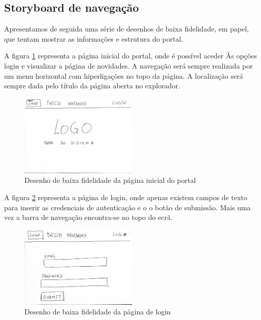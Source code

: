 \FloatBarrier\subsection{Storyboard de navegação}

Apresentamos de seguida uma série de desenhos de baixa fidelidade, em papel, que tentam mostrar as informações e estrutura do portal.

\FloatBarrier
A figura \ref{fig:inicio} representa a página inicial do portal, onde é possível aceder Às opções login e visualizar a página de novidades. A navegação será sempre realizada por um menu horizontal com hiperligações no topo da página. A localização será sempre dada pelo título da página aberta no explorador.
\begin{figure}[!htb]
	\centering
	\includegraphics[width=0.5\textwidth, frame]{figuras/storyboard/frame_0.jpg}
	\caption{Desenho de baixa fidelidade da página inicial do portal}
	\label{fig:inicio}
\end{figure}

\FloatBarrier
A figura \ref{fig:login} representa a página de login, onde apenas existem campos de texto para inserir as credenciais de autenticação e o o botão de submissão. Mais uma vez a barra de navegação encontra-se no topo do ecrã.
\begin{figure}[!htb]
	\centering
	\includegraphics[width=0.5\textwidth, frame]{figuras/storyboard/frame_1.jpg}
	\caption{Desenho de baixa fidelidade da página de login}
	\label{fig:login}
\end{figure}

